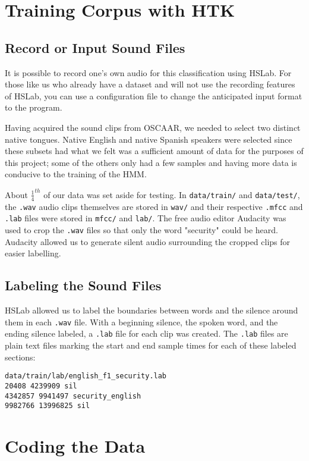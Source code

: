 \documentclass{wileySev}
\begin{document}
\chapter{Training Corpus with HTK}
\section{Record or Input Sound Files}
It is possible to record one's own audio for this classification using HSLab. For those like us who already have a dataset and will not use the recording features of HSLab, you can use a configuration file to change the anticipated input format to the program.

Having acquired the sound clips from OSCAAR, we needed to select two distinct native tongues. Native English and native Spanish speakers were selected since these subsets had what we felt was a sufficient amount of data for the purposes of this project; some of the others only had a few samples and having more data is conducive to the training of the HMM.

About $\frac{1}{4}^{th}$ of our data was set aside for testing. In \texttt{data/train/} and \texttt{data/test/}, the \texttt{.wav} audio clips themselves are stored in \texttt{wav/} and their respective \texttt{.mfcc} and \texttt{.lab} files were stored in \texttt{mfcc/} and \texttt{lab/}. The free audio editor Audacity was used to crop the \texttt{.wav} files so that only the word "security" could be heard. Audacity allowed us to generate silent audio surrounding the cropped clips for easier labelling.

\section{Labeling the Sound Files}
HSLab allowed us to label the boundaries between words and the silence around them in each \texttt{.wav} file. With a beginning silence, the spoken word, and the ending silence labeled, a \texttt{.lab} file for each clip was created. The \texttt{.lab} files are plain text files marking the start and end sample times for each of these labeled sections:

\begin{verbatim}
data/train/lab/english_f1_security.lab
20408 4239909 sil
4342857 9941497 security_english
9982766 13996825 sil
\end{verbatim}

\chapter{Coding the Data}
\end{document}
